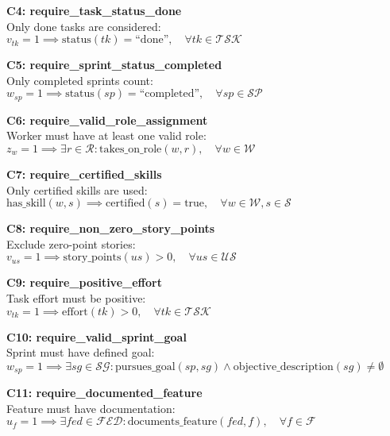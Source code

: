 \documentclass[12pt]{article}
\begin{document}
    \item \textbf{C4: require\_task\_status\_done} \\
    Only done tasks are considered: \\
    $ v_{tk} = 1 \implies \text{status}(tk) = \text{``done''}, \quad \forall tk \in \mathcal{TSK} $

    \item \textbf{C5: require\_sprint\_status\_completed} \\
    Only completed sprints count: \\
    $ w_{sp} = 1 \implies \text{status}(sp) = \text{``completed''}, \quad \forall sp \in \mathcal{SP} $

    \item \textbf{C6: require\_valid\_role\_assignment} \\
    Worker must have at least one valid role: \\
    $ z_w = 1 \implies \exists r \in \mathcal{R} : \text{takes\_on\_role}(w,r), \quad \forall w \in \mathcal{W} $

    \item \textbf{C7: require\_certified\_skills} \\
    Only certified skills are used: \\
    $ \text{has\_skill}(w,s) \implies \text{certified}(s) = \text{true}, \quad \forall w \in \mathcal{W}, s \in \mathcal{S} $

    \item \textbf{C8: require\_non\_zero\_story\_points} \\
    Exclude zero-point stories: \\
    $ v_{us} = 1 \implies \text{story\_points}(us) > 0, \quad \forall us \in \mathcal{US} $

    \item \textbf{C9: require\_positive\_effort} \\
    Task effort must be positive: \\
    $ v_{tk} = 1 \implies \text{effort}(tk) > 0, \quad \forall tk \in \mathcal{TSK} $

    \item \textbf{C10: require\_valid\_sprint\_goal} \\
    Sprint must have defined goal: \\
    $ w_{sp} = 1 \implies \exists sg \in \mathcal{SG} : \text{pursues\_goal}(sp, sg) \land \text{objective\_description}(sg) \neq \emptyset $

    \item \textbf{C11: require\_documented\_feature} \\
    Feature must have documentation: \\
    $ u_f = 1 \implies \exists fed \in \mathcal{FED} : \text{documents\_feature}(fed,f), \quad \forall f \in \mathcal{F} $
\end{document}
